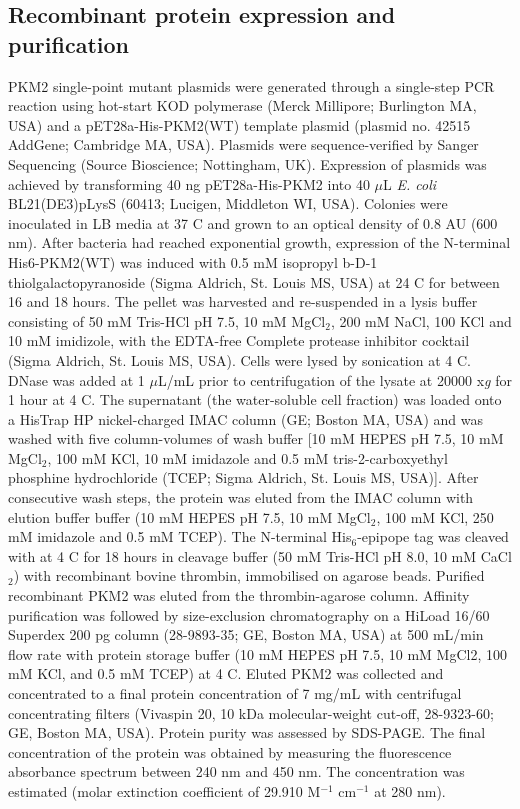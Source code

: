 \subsection{Recombinant protein expression and purification}
PKM2 single-point mutant plasmids were generated through a single-step PCR reaction using hot-start KOD polymerase (Merck Millipore; Burlington MA, USA) and a pET28a-His-PKM2(WT) template plasmid (plasmid no. 42515 AddGene; Cambridge MA, USA). Plasmids were sequence-verified by Sanger Sequencing (Source Bioscience; Nottingham, UK). Expression of plasmids was achieved by transforming 40 ng pET28a-His-PKM2 into 40 $\mu$L \textit{E. coli} BL21(DE3)pLysS (60413; Lucigen, Middleton WI, USA). Colonies were inoculated in LB media at 37 \textdegree C and grown to an optical density of 0.8 AU (600 nm). After bacteria had reached exponential growth, expression of the N-terminal His6-PKM2(WT) was induced with 0.5 mM isopropyl b-D-1 thiolgalactopyranoside (Sigma Aldrich, St. Louis MS, USA) at 24 \textdegree C for between 16 and 18 hours. The pellet was harvested and re-suspended in a lysis buffer consisting of 50 mM Tris-HCl pH 7.5, 10 mM MgCl$_{2}$, 200 mM NaCl, 100 KCl and 10 mM imidizole, with the EDTA-free Complete protease inhibitor cocktail (Sigma Aldrich, St. Louis MS, USA). Cells were lysed by sonication at 4 \textdegree C. DNase was added at 1 $\mu$L/mL prior to centrifugation of the lysate at 20000 x\textit{g} for 1 hour at 4 \textdegree C. The supernatant (the water-soluble cell fraction) was loaded onto a HisTrap HP nickel-charged IMAC column (GE; Boston MA, USA) and was washed with five column-volumes of wash buffer [10 mM HEPES pH 7.5, 10 mM MgCl$_{2}$, 100 mM KCl, 10 mM imidazole and 0.5 mM tris-2-carboxyethyl phosphine hydrochloride (TCEP; Sigma Aldrich, St. Louis MS, USA)]. After consecutive wash steps, the protein was eluted from the IMAC column with elution buffer buffer (10 mM HEPES pH 7.5, 10 mM MgCl$_{2}$, 100 mM KCl, 250 mM imidazole and 0.5 mM TCEP). The N-terminal His$_{6}$-epipope tag was cleaved with at 4 \textdegree C for 18 hours in cleavage buffer (50 mM Tris-HCl pH 8.0, 10 mM CaCl$_{2}$) with recombinant bovine thrombin, immobilised on agarose beads. Purified recombinant PKM2 was eluted from the thrombin-agarose column. Affinity purification was followed by size-exclusion chromatography on a HiLoad 16/60 Superdex 200 pg column (28-9893-35; GE, Boston MA, USA) at 500 mL/min flow rate with protein storage buffer (10 mM HEPES pH 7.5, 10 mM MgCl2, 100 mM KCl, and 0.5 mM TCEP) at 4 \textdegree C. Eluted PKM2 was collected and concentrated to a final protein concentration of 7 mg/mL with centrifugal concentrating filters (Vivaspin 20, 10 kDa molecular-weight cut-off, 28-9323-60; GE, Boston MA, USA). Protein purity was assessed by SDS-PAGE. The final concentration of the protein was obtained by measuring the fluorescence absorbance spectrum between 240 nm and 450 nm. The concentration was estimated (molar extinction coefficient of 29.910 M$^{-1}$ cm$^{-1}$ at 280 nm). 

